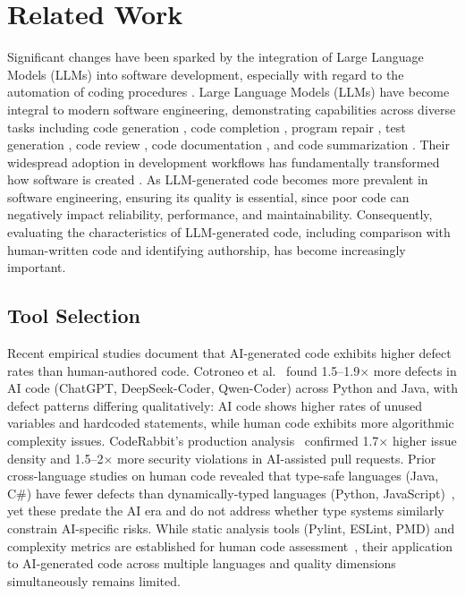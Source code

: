 \section{Related Work}
\label{sec:related-work}

Significant changes have been sparked by the integration of Large Language Models (LLMs) into software development, especially with regard to the automation of coding procedures \cite{feng2020codebert,fu2022linevul,husain2019codesearchnet}. Large Language Models (LLMs) have become integral to modern software engineering, demonstrating capabilities across diverse tasks including code generation \cite{croft2023dataquality,gehrmann2019gltr}, code completion \cite{fu2022vulrepair,javaparser2024}, program repair \cite{husain2019codesearchnet,xia2023keepconversation}, test generation \cite{hu2024radar,liu2024refiningchatgpt}, code review \cite{yang2023detectgpt4code}, code documentation \cite{hochreiter1997lstm}, and code summarization \cite{choi2023chatgptlawschool}. Their widespread adoption in development workflows has fundamentally transformed how software is created \cite{gao2021simcse,hellosimpleai2023robertaqa,openai2023tiktoken}. As LLM-generated code becomes more prevalent in software engineering, ensuring its quality is essential, since poor code can negatively impact reliability, performance, and maintainability. Consequently, evaluating the characteristics of LLM-generated code, including comparison with human-written code and identifying authorship, has become increasingly important.

\subsection{Tool Selection}
\label{sec:tool-selection}

Recent empirical studies document that AI-generated code exhibits higher defect
rates than human-authored code. Cotroneo et al.~\cite{cotroneo2025} found
1.5--1.9$\times$ more defects in AI code (ChatGPT, DeepSeek-Coder, Qwen-Coder) across
Python and Java, with defect patterns differing qualitatively: AI code shows
higher rates of unused variables and hardcoded statements, while human code
exhibits more algorithmic complexity issues. CodeRabbit's production
analysis~\cite{coderabbit2025} confirmed 1.7$\times$ higher issue density and 1.5--2$\times$
more security violations in AI-assisted pull requests. Prior cross-language
studies on human code revealed that type-safe languages (Java, C\#) have fewer
defects than dynamically-typed languages (Python, JavaScript)~\cite{ray2014},
yet these predate the AI era and do not address whether type systems similarly
constrain AI-specific risks. While static analysis tools (Pylint, ESLint, PMD)
and complexity metrics are established for human code assessment~\cite{johnson2013,
ayewah2008}, their application to AI-generated code across multiple languages and quality dimensions simultaneously remains limited.

